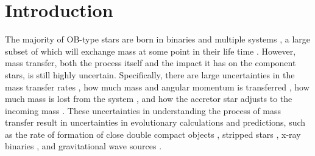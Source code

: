 \documentclass[twocolumn, twocolappendix, oneside]{aastex631}
\begin{document}

{\hypersetup{linkcolor=black}\listoftodos}

\section{Introduction} \label{sec:intro}

The majority of OB-type stars are born in binaries and multiple systems \citep[e.g.][]{Mason+2009, Almeida+2017, Moe+2017}, a large subset of which will exchange mass at some point in their life time \citep[e.g][]{Sana+2012,deMink+2014}. However, mass transfer, both the process itself and the impact it has on the component stars, is still highly uncertain. Specifically, there are large uncertainties in the mass transfer rates \citep{Dray+2007}, how much mass and angular momentum is transferred \citep{Packet1981,Renzo+2021}, how much mass is lost from the system \citep{Tout2012}, and how the accretor star adjusts to the incoming mass \citep{Hellings1983,Braun+1995,Cantiello+2007,Renzo+2023}. These uncertainties in understanding the process of mass transfer result in uncertainties in evolutionary calculations and predictions, such as the rate of formation of close double compact objects \citep{Nelemans+2005,Toonen+2013,Marchant2021+}, stripped stars \citep{Crowther2007,Heber2016,Gotberg+2020}, x-ray binaries \citep{Nelemans+2010}, and gravitational wave sources \citep[e.g.][]{Broekgaarden+2022,Iorio+2023}.


\end{document}
